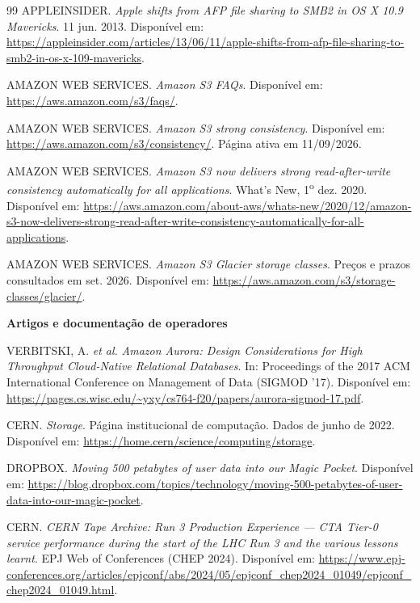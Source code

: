 \documentclass[11pt,a4paper]{article}
\begin{document}
\begin{thebibliography}{99}
 APPLEINSIDER. \textit{Apple shifts from AFP file sharing to SMB2 in OS X 10.9
Mavericks}. 11 jun. 2013. Disponível em:
\url{https://appleinsider.com/articles/13/06/11/apple-shifts-from-afp-file-sharing-to-smb2-in-os-x-109-mavericks}.

 AMAZON WEB SERVICES. \textit{Amazon S3 FAQs}. Disponível em:
\url{https://aws.amazon.com/s3/faqs/}.

 AMAZON WEB SERVICES. \textit{Amazon S3 strong consistency}.
Disponível em: \url{https://aws.amazon.com/s3/consistency/}. Página ativa em 11/09/2026.

 AMAZON WEB SERVICES. \textit{Amazon S3 now delivers strong read-after-write
consistency automatically for all applications}. What's New, 1\textsuperscript{o} dez. 2020. Disponível em:
\url{https://aws.amazon.com/about-aws/whats-new/2020/12/amazon-s3-now-delivers-strong-read-after-write-consistency-automatically-for-all-applications}.

 AMAZON WEB SERVICES. \textit{Amazon S3 Glacier storage classes}. Preços e
prazos consultados em set. 2026. Disponível em:
\url{https://aws.amazon.com/s3/storage-classes/glacier/}.

\smallskip
\item[]\textbf{Artigos e documentação de operadores}

 VERBITSKI, A. \textit{et al.} \textit{Amazon Aurora: Design Considerations for
High Throughput Cloud-Native Relational Databases}. In: Proceedings of the 2017 ACM International
Conference on Management of Data (SIGMOD '17). Disponível em:
\url{https://pages.cs.wisc.edu/~yxy/cs764-f20/papers/aurora-sigmod-17.pdf}.

 CERN. \textit{Storage}. Página institucional de computação. Dados de junho de
2022. Disponível em: \url{https://home.cern/science/computing/storage}.

 DROPBOX. \textit{Moving 500 petabytes of user data into our Magic Pocket}.
Disponível em:
\url{https://blog.dropbox.com/topics/technology/moving-500-petabytes-of-user-data-into-our-magic-pocket}.

 CERN. \textit{CERN Tape Archive: Run 3 Production Experience --- CTA Tier-0 service
performance during the start of the LHC Run 3 and the various lessons learnt}. EPJ Web of
Conferences (CHEP 2024). Disponível em:
\url{https://www.epj-conferences.org/articles/epjconf/abs/2024/05/epjconf_chep2024_01049/epjconf_chep2024_01049.html}.

\end{thebibliography}
\end{document}
